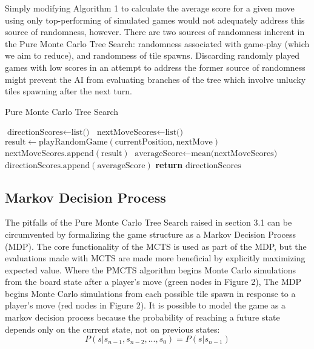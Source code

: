 \documentclass{article}
\begin{document}
Simply modifying Algorithm 1 to calculate the average score for a given move using only top-performing of simulated games would not adequately address this source of randomness, however.  There are two sources of randomness inherent in the Pure Monte Carlo Tree Search: randomness associated with game-play (which we aim to reduce), and randomness of tile spawns.  Discarding randomly played games with low scores in an attempt to address the former source of randomness might prevent the AI from evaluating branches of the tree which involve unlucky tiles spawning after the next turn.

\begin{algorithm}
\label{PMCTS_algo}
    \caption{Pure Monte Carlo Tree Search}
    \begin{algorithmic}[1]
            \State $\text{directionScores} \gets \text{list()}$
                \State $\text{nextMoveScores} \gets \text{list()}$
                    \State $\text{result} \gets \text{playRandomGame}(\text{currentPosition}, \text{nextMove})$
                    \State $\text{nextMoveScores}.\text{append}(\text{result})$
                \EndFor
                \State $\text{averageScore} \gets \text{mean(nextMoveScores)}$
                \State $\text{directionScores}.\text{append}(\text{averageScore})$
            \EndFor
            \State \textbf{return} $\text{directionScores}$
        \EndFunction
    \end{algorithmic}
\end{algorithm}

\subsection{Markov Decision Process}
The pitfalls of the Pure Monte Carlo Tree Search raised in section 3.1 can be circumvented by formalizing the game structure as a Markov Decision Process (MDP).  The core functionality of the MCTS is used as part of the MDP, but the evaluations made with MCTS are made more beneficial by explicitly maximizing expected value.  Where the PMCTS algorithm begins Monte Carlo simulations from the board state after a player's move (green nodes in Figure 2), The MDP begins Monte Carlo simulations from each possible tile spawn in response to a player's move (red nodes in Figure 2).  It is possible to model the game as a markov decision process because the probability of reaching a future state depends only on the current state, not on previous states: 
$$P(s|s_{n-1}, s_{n-2},...,s_{0}) = P(s|s_{n-1}) $$
\end{document}

